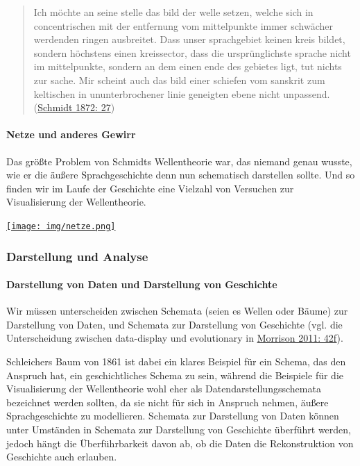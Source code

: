 \begin{quote}
Ich möchte an seine stelle das bild der welle setzen, welche sich in
concentrischen mit der entfernung vom mittelpunkte immer schwächer
werdenden ringen ausbreitet. Dass unser sprachgebiet keinen kreis
bildet, sondern höchstens einen kreissector, dass die ursprünglichste
sprache nicht im mittelpunkte, sondern an dem einen ende des gebietes
ligt, tut nichts zur sache. Mir scheint auch das bild einer schiefen vom
sanskrit zum keltischen in ununterbrochener linie geneigten ebene nicht
unpassend.
(\href{http://bibliography.lingpy.org?key=Schmidt1872}{Schmidt 1872:
27})
\end{quote}





\paragraph{Netze und anderes Gewirr}

Das größte Problem von Schmidts Wellentheorie war, das niemand genau
wusste, wie er die äußere Sprachgeschichte denn nun schematisch
darstellen sollte. Und so finden wir im Laufe der Geschichte eine
Vielzahl von Versuchen zur Visualisierung der Wellentheorie.






\href{img/netze.png}{\texttt{[image: img/netze.png]}}



\subsubsection{\texorpdfstring{{Darstellung und
Analyse}}{Darstellung und Analyse}}

\paragraph{Darstellung von Daten und Darstellung von Geschichte}

Wir müssen unterscheiden zwischen Schemata (seien es Wellen oder Bäume)
zur Darstellung von Daten, und Schemata zur Darstellung von Geschichte
(vgl. die Unterscheidung zwischen data-display und evolutionary in
\href{http://bibliography.lingpy.org?key=Morrison2011}{Morrison 2011:
42f}).





Schleichers Baum von 1861 ist dabei ein klares Beispiel für ein Schema,
das den Anspruch hat, ein geschichtliches Schema zu sein, während die
Beispiele für die Visualisierung der Wellentheorie wohl eher als
Datendarstellungsschemata bezeichnet werden sollten, da sie nicht für
sich in Anspruch nehmen, äußere Sprachgeschichte zu modellieren.
Schemata zur Darstellung von Daten können unter Umständen in Schemata
zur Darstellung von Geschichte überführt werden, jedoch hängt die
Überführbarkeit davon ab, ob die Daten die Rekonstruktion von Geschichte
auch erlauben.




